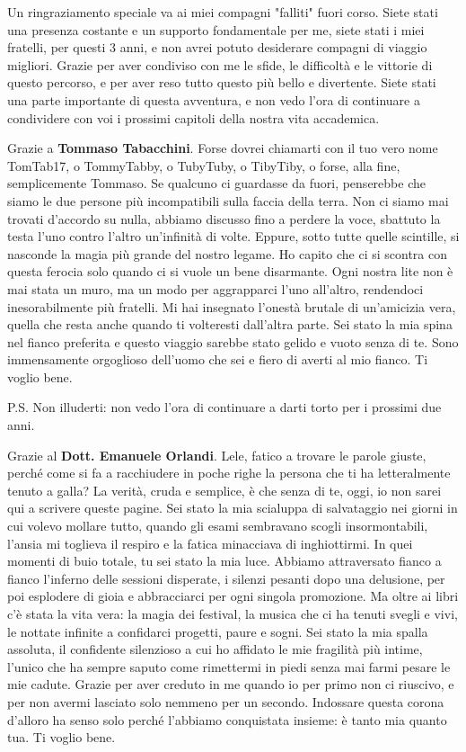 \vspace{1em}

\noindent
Un ringraziamento speciale va ai miei compagni "falliti" fuori corso.
Siete stati una presenza costante e un supporto fondamentale per me, siete stati i miei fratelli, per questi 3 anni, e non avrei potuto desiderare compagni di viaggio migliori. Grazie per aver condiviso con me le sfide, le difficoltà e le vittorie di questo percorso, e per aver reso tutto questo più bello e divertente. Siete stati una parte importante di questa avventura, e non vedo l'ora di continuare a condividere con voi i prossimi capitoli della nostra vita accademica.

Grazie a \textbf{Tommaso Tabacchini}. 
Forse dovrei chiamarti con il tuo vero nome TomTab17, o TommyTabby, o TubyTuby, o TibyTiby, o forse, alla fine, semplicemente Tommaso. Se qualcuno ci guardasse da fuori, penserebbe che siamo le due persone più incompatibili sulla faccia della terra. Non ci siamo mai trovati d'accordo su nulla, abbiamo discusso fino a perdere la voce, sbattuto la testa l'uno contro l'altro un'infinità di volte. Eppure, sotto tutte quelle scintille, si nasconde la magia più grande del nostro legame. Ho capito che ci si scontra con questa ferocia solo quando ci si vuole un bene disarmante. Ogni nostra lite non è mai stata un muro, ma un modo per aggrapparci l'uno all'altro, rendendoci inesorabilmente più fratelli. Mi hai insegnato l'onestà brutale di un'amicizia vera, quella che resta anche quando ti volteresti dall'altra parte. Sei stato la mia spina nel fianco preferita e questo viaggio sarebbe stato gelido e vuoto senza di te. Sono immensamente orgoglioso dell'uomo che sei e fiero di averti al mio fianco. Ti voglio bene.

\noindent
P.S. Non illuderti: non vedo l'ora di continuare a darti torto per i prossimi due anni.

Grazie al \textbf{Dott. Emanuele Orlandi}. 
Lele, fatico a trovare le parole giuste, perché come si fa a racchiudere in poche righe la persona che ti ha letteralmente tenuto a galla? La verità, cruda e semplice, è che senza di te, oggi, io non sarei qui a scrivere queste pagine. Sei stato la mia scialuppa di salvataggio nei giorni in cui volevo mollare tutto, quando gli esami sembravano scogli insormontabili, l'ansia mi toglieva il respiro e la fatica minacciava di inghiottirmi. In quei momenti di buio totale, tu sei stato la mia luce. Abbiamo attraversato fianco a fianco l'inferno delle sessioni disperate, i silenzi pesanti dopo una delusione, per poi esplodere di gioia e abbracciarci per ogni singola promozione. Ma oltre ai libri c'è stata la vita vera: la magia dei festival, la musica che ci ha tenuti svegli e vivi, le nottate infinite a confidarci progetti, paure e sogni. Sei stato la mia spalla assoluta, il confidente silenzioso a cui ho affidato le mie fragilità più intime, l'unico che ha sempre saputo come rimettermi in piedi senza mai farmi pesare le mie cadute. Grazie per aver creduto in me quando io per primo non ci riuscivo, e per non avermi lasciato solo nemmeno per un secondo. Indossare questa corona d'alloro ha senso solo perché l'abbiamo conquistata insieme: è tanto mia quanto tua. Ti voglio bene.

